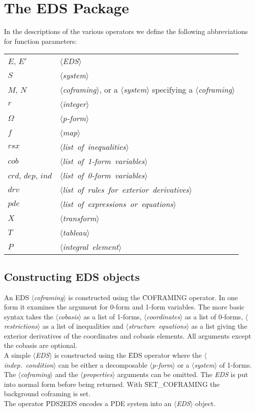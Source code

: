 \documentclass[11pt,letterpaper]{book}
\newcommand{\meta}[1]{\mbox{$\langle$\it#1\/$\rangle$}}
\begin{document}
\section{The EDS Package}

In the descriptions of the various operators we define the following
abbreviations for function parameters:
\vspace{0.25cm}

\begin{tabular}{ll}
$E$, $E'$   & \meta{EDS}\\
$S$         & \meta{system}\\
$M$, $N$    & \meta{coframing}, or a \meta{system} specifying a \meta{coframing}\\
$r$         & \meta{integer}\\
$\Omega$    & \meta{p-form}\\
$f$         & \meta{map}\\
$rsx$       & \meta{list of inequalities}\\
$cob$       & \meta{list of 1-form variables}\\
$crd$, $dep$, $ind$
            & \meta{list of 0-form variables}\\
$drv$       & \meta{list of rules for exterior derivatives}\\
$pde$       & \meta{list of expressions or equations}\\
$X$         & \meta{transform}\\
$T$         & \meta{tableau}\\
$P$         & \meta{integral element}\\
\end{tabular}


\subsection{Constructing EDS objects}

An EDS \meta{coframing} is constructed using the \f{COFRAMING} operator.
In one form it examines the argument for 0-form and 1-form variables. The more
basic syntax takes the \meta{cobasis} as a list of 1-forms, \meta{coordinates}
as a list of 0-forms, \meta{restrictions} as a list of inequalities and
\meta{structure equations} as a list giving the exterior derivatives of the
coordinates and cobasis elements. All arguments except the cobasis are optional. \\
A simple \meta{EDS} is constructed using the \f{EDS} operator where the
\meta{indep. condition} can be either a decomposable \meta{p-form} or a
\meta{system} of 1-forms. The \meta{coframing} and the \meta{properties}
arguments can be omitted. The {\it EDS} is put into normal form before being
returned. With \f{SET\_COFRAMING} the background coframing is set. \\
The operator \f{PDS2EDS} encodes a PDE system into an \meta{EDS} object. \\
\end{document}
